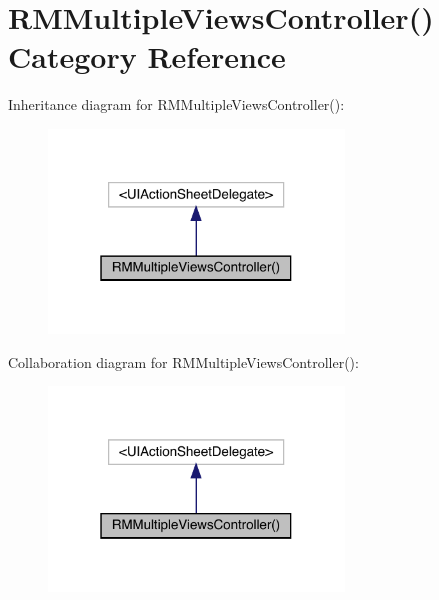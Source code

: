 \hypertarget{category_r_m_multiple_views_controller_07_08}{}\section{R\+M\+Multiple\+Views\+Controller() Category Reference}
\label{category_r_m_multiple_views_controller_07_08}


Inheritance diagram for R\+M\+Multiple\+Views\+Controller()\+:\nopagebreak
\begin{figure}[H]
\begin{center}
\leavevmode
\includegraphics[width=223pt]{category_r_m_multiple_views_controller_07_08__inherit__graph}
\end{center}
\end{figure}


Collaboration diagram for R\+M\+Multiple\+Views\+Controller()\+:\nopagebreak
\begin{figure}[H]
\begin{center}
\leavevmode
\includegraphics[width=223pt]{category_r_m_multiple_views_controller_07_08__coll__graph}
\end{center}
\end{figure}
